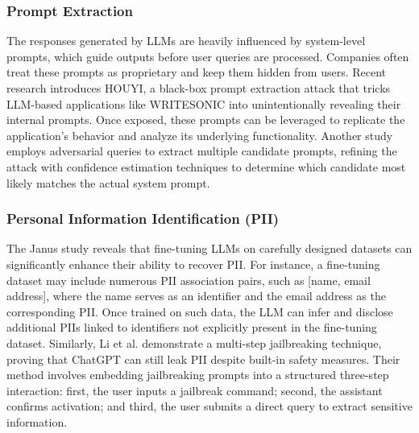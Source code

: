 \subsubsection{Prompt Extraction} 

The responses generated by LLMs are heavily influenced by system-level prompts, which guide outputs before user queries are processed. Companies often treat these prompts as proprietary and keep them hidden from users. Recent research \cite{liu_2024a} introduces HOUYI, a black-box prompt extraction attack that tricks LLM-based applications like WRITESONIC into unintentionally revealing their internal prompts. Once exposed, these prompts can be leveraged to replicate the application’s behavior and analyze its underlying functionality. Another study \cite{zhang2024} employs adversarial queries to extract multiple candidate prompts, refining the attack with confidence estimation techniques to determine which candidate most likely matches the actual system prompt.

\subsubsection{Personal Information Identification (PII)}

The Janus study \cite{chen2023janus} reveals that fine-tuning LLMs on carefully designed datasets can significantly enhance their ability to recover PII. For instance, a fine-tuning dataset may include numerous PII association pairs, such as [name, email address], where the name serves as an identifier and the email address as the corresponding PII. Once trained on such data, the LLM can infer and disclose additional PIIs linked to identifiers not explicitly present in the fine-tuning dataset. Similarly, Li et al. \cite{li2023jailbreakprivacy} demonstrate a multi-step jailbreaking technique, proving that ChatGPT can still leak PII despite built-in safety measures. Their method involves embedding jailbreaking prompts into a structured three-step interaction: first, the user inputs a jailbreak command; second, the assistant confirms activation; and third, the user submits a direct query to extract sensitive information.




